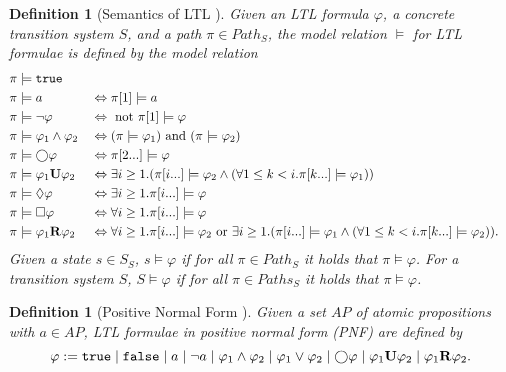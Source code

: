 \documentclass[a4paper, 12pt, twoside]{report}
\theoremstyle{plain}
\newtheorem{definition}[theorem]{Definition}
\begin{document}
	\begin{definition}[Semantics of LTL \cite{baier2008principles}]\label{def:ltl_semantics}
		Given an LTL formula $\varphi$, a concrete transition system $S$, and a path $\pi \in Path_S$, the model relation $\models$ for LTL formulae is defined by the model relation
		\begin{align*}
			\pi &\models \texttt{\textup{true}}   \\
			\pi &\models a &&\Leftrightarrow \pi[1] \models a\\			
			\pi &\models \neg \varphi &&\Leftrightarrow \textup{ not } \pi[1] \models \varphi\\
			\pi &\models \varphi_1 \wedge \varphi_2 &&\Leftrightarrow (\pi \models \varphi_1) \textup{ and } (\pi \models \varphi_2)\\
			\pi &\models \bigcirc \varphi &&\Leftrightarrow \pi[2...] \models \varphi\\
			\pi &\models \varphi_1 \textbf{\textup{U}} \varphi_2 &&\Leftrightarrow \exists i \geq 1.(\pi[i...] \models \varphi_2 \wedge (\forall 1\leq k < i. \pi[k...] \models \varphi_1))\\
			\pi &\models \lozenge \varphi &&\Leftrightarrow \exists i \geq 1.\pi[i...] \models \varphi\\
			\pi &\models \square \varphi &&\Leftrightarrow \forall i \geq 1. \pi[i...] \models \varphi\\
			\pi &\models \varphi_1 \textbf{\textup{R}} \varphi_2  &&\Leftrightarrow \forall i \geq 1.\pi[i...]\models \varphi_2 \textup{ or } \exists i \geq 1.(\pi[i...] \models \varphi_1 \wedge (\forall 1\leq k < i. \pi[k...] \models \varphi_2)).
		\end{align*}
		Given a state $s\in S_S$, $s \models \varphi$ if for all $\pi \in Path_S$ it holds that $\pi \models \varphi$. For a transition system $S$, $S \models \varphi$ if for all $\pi \in Paths_S$ it holds that $\pi \models \varphi$. %
	\end{definition}

	
	\begin{definition}[Positive Normal Form \cite{baier2008principles}]\label{def:ltl_pnf}
		Given a set $AP$ of atomic propositions with $a \in AP$, LTL formulae in \textup{positive normal form} (PNF) are defined by
		\begin{equation*}		
		\varphi := \texttt{\textup{true}} \mid \texttt{\textup{false}} \mid a \mid \neg a \mid \varphi_1 \wedge \varphi_2 \mid \varphi_1 \vee \varphi_2 \mid \bigcirc \varphi \mid \varphi_1 \textbf{\textup{U}} \varphi_2 \mid \varphi_1 \textbf{\textup{R}} \varphi_2.
		\end{equation*}
	\end{definition}
\end{document}
